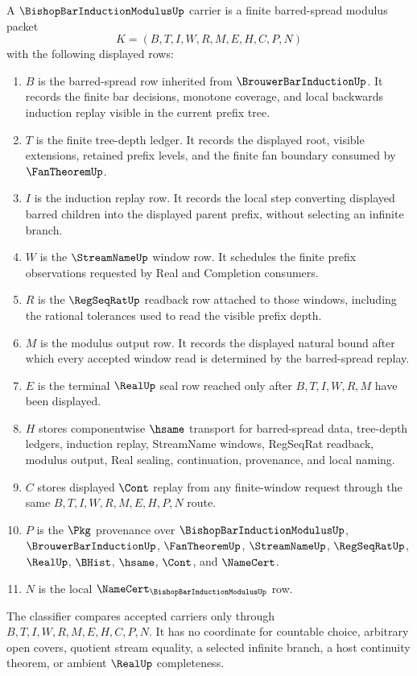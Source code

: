 \begin{definition}
\label{def:bishop-bar-induction-modulus-carrier}
A $\BishopBarInductionModulusUp$ carrier is a finite barred-spread modulus packet
$$
K=(B,T,I,W,R,M,E,H,C,P,N)
$$
with the following displayed rows:
\begin{enumerate}
\item $B$ is the barred-spread row inherited from $\BrouwerBarInductionUp$. It records the finite bar decisions, monotone coverage, and local backwards induction replay visible in the current prefix tree.
\item $T$ is the finite tree-depth ledger. It records the displayed root, visible extensions, retained prefix levels, and the finite fan boundary consumed by $\FanTheoremUp$.
\item $I$ is the induction replay row. It records the local step converting displayed barred children into the displayed parent prefix, without selecting an infinite branch.
\item $W$ is the $\StreamNameUp$ window row. It schedules the finite prefix observations requested by Real and Completion consumers.
\item $R$ is the $\RegSeqRatUp$ readback row attached to those windows, including the rational tolerances used to read the visible prefix depth.
\item $M$ is the modulus output row. It records the displayed natural bound after which every accepted window read is determined by the barred-spread replay.
\item $E$ is the terminal $\RealUp$ seal row reached only after $B,T,I,W,R,M$ have been displayed.
\item $H$ stores componentwise $\hsame$ transport for barred-spread data, tree-depth ledgers, induction replay, StreamName windows, RegSeqRat readback, modulus output, Real sealing, continuation, provenance, and local naming.
\item $C$ stores displayed $\Cont$ replay from any finite-window request through the same $B,T,I,W,R,M,E,H,P,N$ route.
\item $P$ is the $\Pkg$ provenance over $\BishopBarInductionModulusUp$, $\BrouwerBarInductionUp$, $\FanTheoremUp$, $\StreamNameUp$, $\RegSeqRatUp$, $\RealUp$, $\BHist$, $\hsame$, $\Cont$, and $\NameCert$.
\item $N$ is the local $\NameCert_{\BishopBarInductionModulusUp}$ row.
\end{enumerate}
The classifier compares accepted carriers only through $B,T,I,W,R,M,E,H,C,P,N$. It has no coordinate for countable choice, arbitrary open covers, quotient stream equality, a selected infinite branch, a host continuity theorem, or ambient $\RealUp$ completeness.
\end{definition}

